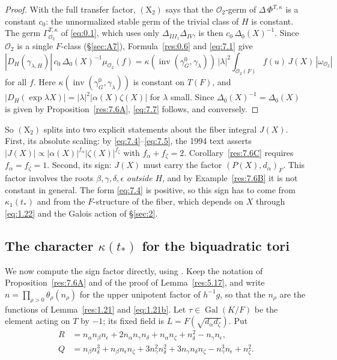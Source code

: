 \documentclass[12pt,letterpaper]{amsart}
\theoremstyle{plain}
\theoremstyle{definition}
\theoremstyle{remark}
\theoremstyle{definition}
\DeclareMathOperator{\Gal}{Gal}
\DeclareMathOperator{\inv}{inv}
\begin{document}
\begin{proof}
With the full transfer factor, $(\mathrm X_2)$ says that the $\mathcal
O_2$-germ of $\Delta\,\Phi^{T,\kappa}$ is a constant $c_0$: the unnormalized
stable germ of the trivial class of $H$ is constant. The germ
$\Gamma^{T,\kappa}_{\mathcal O_2}$ of \eqref{eq:0.1}, which uses only
$\Delta_{III_1}\Delta_{IV}$, is then $c_0\,\Delta_0(X)^{-1}$. Since
$\mathcal O_2$ is a single $F$-class (\S\ref{sec:A7}), Formula~\ref{res:0.6}
and \eqref{eq:7.1} give
\[
|D_H(\gamma_{\lambda,H})|\,c_0\,\Delta_0(X)^{-1}\mu_{\mathcal O_2}(f)
=\kappa(\inv(\gamma^0_G,\gamma_\lambda))\,|\lambda|^2
\int_{\mathcal O_2(F)}f(u)\,J(X)\,|\omega_{\mathcal O_2}|
\]
for all $f$. Here $\kappa(\inv(\gamma^0_G,\gamma_\lambda))$ is constant on
$T(F)$, and $|D_H(\exp\lambda X)|=|\lambda|^2|\alpha(X)\zeta(X)|$ for
$\lambda$ small. Since $\Delta_0(X)^{-1}=\Delta_0(X)$ is given by
Proposition~\ref{res:7.6A}, \eqref{eq:7.7} follows, and conversely.
\end{proof}

So $(\mathrm X_2)$ splits into two explicit statements about the fiber integral
$J(X)$. First, its absolute scaling: by \eqref{eq:7.4}--\eqref{eq:7.5}, the
1994 text asserts $|J(X)|\propto|\alpha(X)|^{f_\alpha}|\zeta(X)|^{f_\zeta}$
with $f_\alpha+f_\zeta=2$. Corollary~\ref{res:7.6C} requires
$f_\alpha=f_\zeta=1$. Second, its sign: $J(X)$ must carry the factor
$(P(X),d_\alpha)_F$. This factor involves the roots $\beta,\gamma,\delta,\epsilon$
\emph{outside} $H$, and by Example~\ref{res:7.6B} it is not constant in
general. The form \eqref{eq:7.4} is positive, so this sign has to come from
$\kappa_1(t_*)$ and from the $F$-structure of the fiber, which depends on $X$
through \eqref{eq:1.22} and the Galois action of \S\ref{sec:2}.

\subsection*{The character \texorpdfstring{$\kappa(t_*)$}{kappa(t*)} for the biquadratic tori}

We now compute the sign factor directly, using \cite[Ch.~I, \S5]{Ha92a}. Keep
the notation of Proposition~\ref{res:7.6A} and of the proof of
Lemma~\ref{res:5.17}, and write $n=\prod_{\rho>0}\theta_\rho(n_\rho)$ for the
upper unipotent factor of $h^{-1}g$, so that the $n_\rho$ are the functions of
Lemma~\ref{res:1.21} and \eqref{eq:1.21b}. Let $\tau\in\Gal(K/F)$ be the
element acting on $T$ by $-1$; its fixed field is $L=F(\sqrt{d_\alpha d_\zeta})$.
Put
\begin{equation}\tag{7.8}\label{eq:7.8}
\begin{split}
R&=n_\alpha n_\beta n_\epsilon+2n_\alpha n_\gamma n_\delta+n_\alpha n_\zeta
+n_\delta^2-n_\gamma n_\epsilon,\\
Q&=n_\beta n_\delta^3+n_\beta n_\epsilon n_\zeta+3n_\gamma^2n_\delta^2
+3n_\gamma n_\delta n_\zeta-n_\gamma^3n_\epsilon+n_\zeta^2 .
\end{split}
\end{equation}
\end{document}
